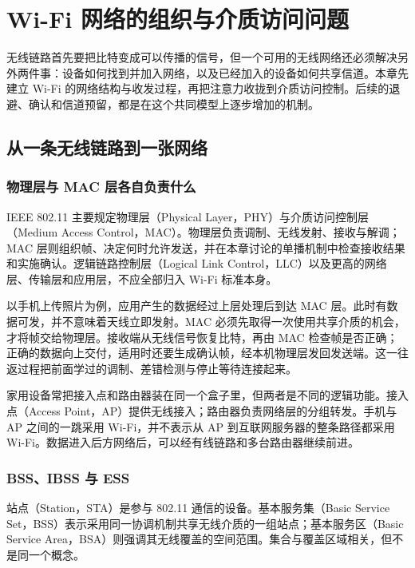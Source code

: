 \section{Wi-Fi 网络的组织与介质访问问题}
\label{ch:wifi-organization}

无线链路首先要把比特变成可以传播的信号，但一个可用的无线网络还必须解决另外两件事：设备如何找到并加入网络，以及已经加入的设备如何共享信道。本章先建立 Wi-Fi 的网络结构与收发过程，再把注意力收拢到介质访问控制。后续的退避、确认和信道预留，都是在这个共同模型上逐步增加的机制。

\subsection{从一条无线链路到一张网络}

\subsubsection{物理层与 MAC 层各自负责什么}

IEEE 802.11 主要规定物理层（Physical Layer，PHY）与介质访问控制层（Medium Access Control，MAC）。物理层负责调制、无线发射、接收与解调；MAC 层则组织帧、决定何时允许发送，并在本章讨论的单播机制中检查接收结果和实施确认。逻辑链路控制层（Logical Link Control，LLC）以及更高的网络层、传输层和应用层，不应全部归入 Wi-Fi 标准本身。

以手机上传照片为例，应用产生的数据经过上层处理后到达 MAC 层。此时有数据可发，并不意味着天线立即发射。MAC 必须先取得一次使用共享介质的机会，才将帧交给物理层。接收端从无线信号恢复比特，再由 MAC 检查帧是否正确；正确的数据向上交付，适用时还要生成确认帧，经本机物理层发回发送端。这一往返过程把前面学过的调制、差错检测与停止等待连接起来。

家用设备常把接入点和路由器装在同一个盒子里，但两者是不同的逻辑功能。接入点（Access Point，AP）提供无线接入；路由器负责网络层的分组转发。手机与 AP 之间的一跳采用 Wi-Fi，并不表示从 AP 到互联网服务器的整条路径都采用 Wi-Fi。数据进入后方网络后，可以经有线链路和多台路由器继续前进。

\subsubsection{BSS、IBSS 与 ESS}

站点（Station，STA）是参与 802.11 通信的设备。基本服务集（Basic Service Set，BSS）表示采用同一协调机制共享无线介质的一组站点；基本服务区（Basic Service Area，BSA）则强调其无线覆盖的空间范围。集合与覆盖区域相关，但不是同一个概念。

